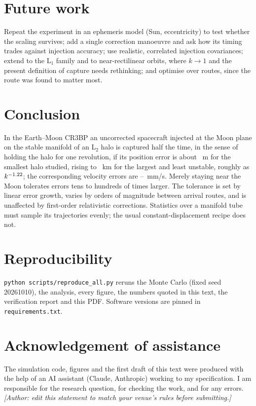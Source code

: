 \documentclass[11pt,a4paper]{article}
\begin{document}
\section{Future work}
Repeat the experiment in an ephemeris model (Sun, eccentricity) to test whether the scaling survives; add a single
correction manoeuvre and ask how its timing trades against injection accuracy; use realistic, correlated injection covariances;
extend to the L$_1$ family and to near-rectilinear orbits, where $k\to1$ and the present definition of capture needs rethinking;
and optimise over routes, since the route was found to matter most.

\section{Conclusion}
In the Earth--Moon CR3BP an uncorrected spacecraft injected at the Moon plane on the stable manifold of an L$_2$ halo
is captured half the time, in the sense of holding the halo for one revolution, if its position error is about
\SposAFirst~m for the smallest halo studied, rising to \SposALastKm~km for the largest and least unstable, roughly as $k^{-1.22}$;
the corresponding velocity errors are \SvelAFirst--\SvelALast~mm/s. Merely staying near the Moon tolerates errors tens to hundreds of times larger. The tolerance
is set by linear error growth, varies by orders of magnitude between arrival routes, and is unaffected by first-order relativistic
corrections. Statistics over a manifold tube must sample its trajectories evenly; the usual constant-displacement recipe does not.

\section*{Reproducibility}\label{sec:repro}
\texttt{python scripts/reproduce\_all.py} reruns the Monte Carlo (fixed seed 20261010), the analysis, every figure, the
numbers quoted in this text, the verification report and this PDF. Software versions are pinned in \texttt{requirements.txt}.

\section*{Acknowledgement of assistance}
The simulation code, figures and the first draft of this text were produced with the help of an AI assistant
(Claude, Anthropic) working to my specification. I am responsible for the research question, for checking the
work, and for any errors. \emph{[Author: edit this statement to match your venue's rules before submitting.]}
\end{document}
